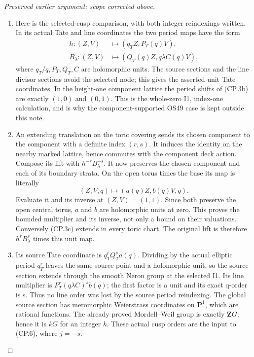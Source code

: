 \begin{proof}[Preserved earlier argument; scope corrected above]
\begin{enumerate}[label=\arabic*.]
\item Here is the selected-cusp comparison, with both integer reindexings
written. In its actual Tate and line coordinates the two period maps
have the form
\[
 \begin{split}
 h:(Z,V)&\longmapsto(q_T Z,P_T(q)V),\\
 B_\lambda:(Z,V)&\longmapsto(Q_T(q)Z,
                              q\lambda C(q)V),
 \end{split}                                                \tag{CP.3b}
\]
where \(q_T/q,P_T,Q_T,C\) are holomorphic units. The source
sections and the line divisor sections avoid the selected node;
this gives the asserted unit Tate coordinates. In the height-one
component lattice the period shifts of (CP.3b) are exactly
\((1,0)\) and \((0,1)\). This is the whole-zero I1, index-one
calculation, and is why the component-supported OS49 case is kept
outside this note.

\item An extending translation on the toric covering sends its chosen
component to the component with a definite index \((r,s)\).
It induces the identity on the nearby marked lattice, hence commutes
with the component deck action. Compose its lift with
\(h^{-r}B_\lambda^{-s}\). It now preserves the chosen component
and each of its boundary strata. On the open torus times the base
its map is literally
\[
                  (Z,V,q)\longmapsto(a(q)Z,b(q)V,q).
                                                               \tag{CP.3c}
\]
Evaluate it and its inverse at \((Z,V)=(1,1)\). Since both preserve
the open central torus, \(a\) and \(b\) are holomorphic units
at zero. This proves the bounded multiplier and its inverse, not
only a bound on their valuations. Conversely (CP.3c) extends in
every toric chart. The original lift is therefore
\(h^rB_\lambda^s\) times this unit map.

\item Its source Tate coordinate is \(q_T^r Q_T^s a(q)\). Dividing by
the actual elliptic period \(q_T^r\) leaves the same source point
and a holomorphic unit, so the source section extends through the
smooth Neron group at the selected I1. Its line multiplier is
\(P_T^r(q\lambda C)^s b(q)\); the first factor is a unit and
its exact q-order is s. Thus no line order was lost by the source
period reindexing. The global source section has meromorphic
Weierstrass coordinates on \(\mathbf P^1\), which are rational
functions. The already proved Mordell--Weil group is exactly
\(\mathbf ZG\); hence it is \(kG\) for an integer \(k\). These actual
cusp orders are the input to (CP.6), where \(j=-s\).


\end{enumerate}
\end{proof}
